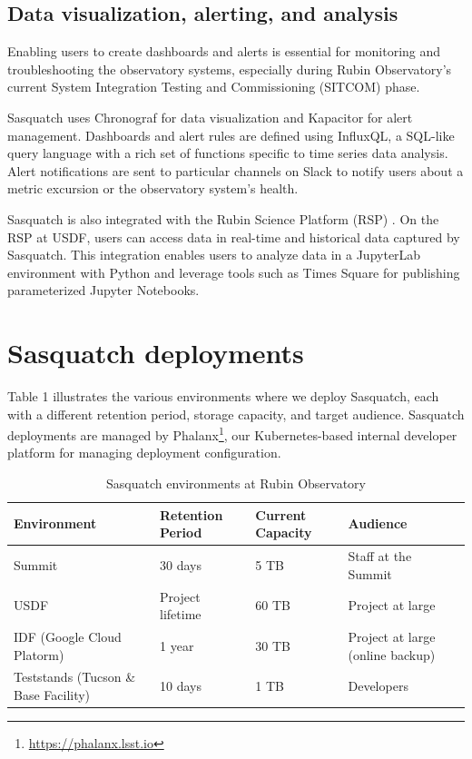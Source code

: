 \subsection{Data visualization, alerting, and analysis}

Enabling users to create dashboards and alerts is essential for monitoring and troubleshooting the observatory systems, especially during Rubin Observatory's current System Integration Testing and Commissioning (SITCOM) phase.

Sasquatch uses Chronograf for data visualization and Kapacitor for alert management. Dashboards and alert rules are defined using InfluxQL, a SQL-like query language with a rich set of functions specific to time series data analysis. Alert notifications are sent to particular channels on Slack to notify users about a metric excursion or the observatory system's health.

Sasquatch is also integrated with the Rubin Science Platform (RSP) \cite{DMTN-082, DMTN-212}. On the RSP at USDF, users can access data in real-time and historical data captured by Sasquatch. This integration enables users to analyze data in a JupyterLab environment with Python and leverage tools such as Times Square \cite{SQR-062} for publishing parameterized Jupyter Notebooks.

\section{Sasquatch deployments}
\label{sec:deploy}

Table 1 illustrates the various environments where we deploy Sasquatch, each with a different retention period, storage capacity, and target audience. Sasquatch deployments are managed by Phalanx\footnote{\url{https://phalanx.lsst.io}}, our Kubernetes-based internal developer platform for managing deployment configuration.

\begin{table}[ht]
    \small
    \centering
    \caption{Sasquatch environments at Rubin Observatory}
    \begin{tabular}{@{}llll@{}}
        \toprule
        \textbf{Environment} & \textbf{Retention Period} & \textbf{Current Capacity} & \textbf{Audience} \\
        \midrule
        Summit & 30 days & 5 TB & Staff at the Summit \\
        USDF & Project lifetime & 60 TB & Project at large \\
        IDF (Google Cloud Platorm) & 1 year & 30 TB & Project at large (online backup) \\
        Teststands (Tucson \& Base Facility) & 10 days & 1 TB & Developers \\
        \bottomrule
    \end{tabular}
\end{table}

